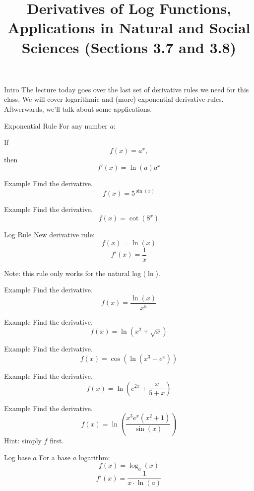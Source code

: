 \documentclass[t]{beamer}
\title{Derivatives of Log Functions, Applications in Natural and Social Sciences (Sections 3.7 and 3.8)}
\date{}
\begin{document}
\frame{\titlepage}

\begin{frame}{Intro}
The lecture today goes over the last set of derivative rules
we need for this class. We will cover logarithmic and
(more) exponential derivative rules. Aftwerwards, we'll talk 
about some applications.
\end{frame}

\begin{frame}{Exponential Rule}
For any number $a$:

If 
$$f(x) = a^x,$$
then
$$f'(x) = \ln(a) a^x$$
\end{frame}

\begin{frame}{Example}
Find the derivative.
$$f(x) = 5^{\sin(x)}$$
\end{frame}

\begin{frame}{Example}
Find the derivative.
$$f(x) = \cot(8^x)$$
\end{frame}

\begin{frame}{Log Rule}
New derivative rule:
$$f(x) = \ln(x)$$
$$f'(x) = \frac{1}{x}$$

Note: this rule only works for the natural log ($\ln$).
\end{frame}

\begin{frame}{Example}
Find the derivative.
$$f(x) = \frac{\ln(x)}{x^5}$$
\end{frame}

\begin{frame}{Example}
Find the derivative.
$$f(x) = \ln(x^2 + \sqrt{x})$$
\end{frame}

\begin{frame}{Example}
Find the derivative.
$$f(x) = \cos(\ln(x^3 - e^x))$$
\end{frame}

\begin{frame}{Example}
Find the derivative.
$$f(x) = \ln\left( e^{2x} + \frac{x}{5+x}\right)$$
\end{frame}

\begin{frame}{Example}
Find the derivative.
$$f(x) = \ln \left(\frac{x^3 e^x (x^2 + 1)}{\sin(x)} \right)$$
Hint: simply $f$ first.
\end{frame}

\begin{frame}{Log base $a$}
For a base $a$ logarithm:
$$f(x) = \log_a(x)$$
$$f'(x) = \frac{1}{x \cdot \ln(a)}$$
\end{frame}
\end{document}
